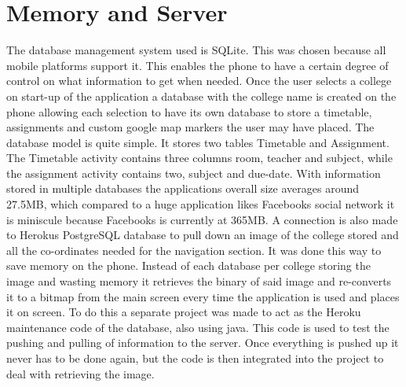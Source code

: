 \section{Memory and Server}
The database management system used is SQLite. This was chosen because all mobile platforms support it. This enables the phone to have a certain degree of control on what information to get when needed. Once the user selects a college on start-up of the application a database with the college name is created on the phone allowing each selection to have its own database to store a timetable, assignments and custom google map markers the user may have placed. The database model is quite simple. It stores two tables Timetable and Assignment. The Timetable activity contains three columns room, teacher and subject, while the assignment activity contains two, subject and due-date. With information stored in multiple databases the applications overall size averages around 27.5MB, which compared to a huge application likes Facebooks social network it is miniscule because Facebooks is currently at 365MB. 
A connection is also made to Herokus PostgreSQL database to pull down an image of the college stored and all the co-ordinates needed for the navigation section. It was done this way to save memory on the phone. Instead of each database per college storing the image and wasting memory it retrieves the binary of said image and re-converts it to a bitmap from the main screen every time the application is used and places it on screen. To do this a separate project was made to act as the Heroku maintenance code of the database, also using java. This code is used to test the pushing and pulling of information to the server. Once everything is pushed up it never has to be done again, but the code is then integrated into the project to deal with retrieving the image.

